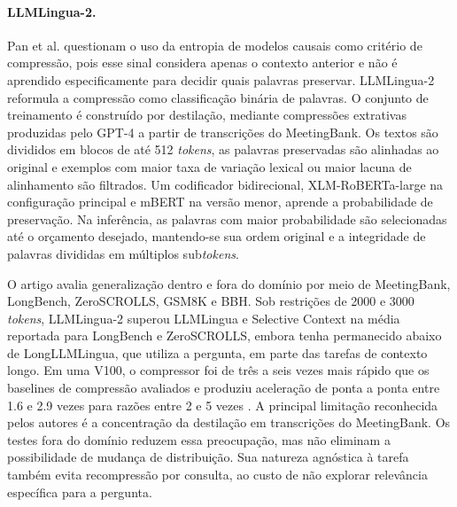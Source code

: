 \paragraph{LLMLingua-2.}
Pan et al. \cite{pan2024llmlingua2} questionam o uso da entropia de modelos causais como critério de compressão, pois esse sinal considera apenas o contexto anterior e não é aprendido especificamente para decidir quais palavras preservar. LLMLingua-2 reformula a compressão como classificação binária de palavras. O conjunto de treinamento é construído por destilação, mediante compressões extrativas produzidas pelo GPT-4 a partir de transcrições do MeetingBank. Os textos são divididos em blocos de até 512 \textit{tokens}, as palavras preservadas são alinhadas ao original e exemplos com maior taxa de variação lexical ou maior lacuna de alinhamento são filtrados. Um codificador bidirecional, XLM-RoBERTa-large na configuração principal e mBERT na versão menor, aprende a probabilidade de preservação. Na inferência, as palavras com maior probabilidade são selecionadas até o orçamento desejado, mantendo-se sua ordem original e a integridade de palavras divididas em múltiplos sub\textit{tokens}.

O artigo avalia generalização dentro e fora do domínio por meio de MeetingBank, LongBench, ZeroSCROLLS, GSM8K e BBH. Sob restrições de 2000 e 3000 \textit{tokens}, LLMLingua-2 superou LLMLingua e Selective Context na média reportada para LongBench e ZeroSCROLLS, embora tenha permanecido abaixo de LongLLMLingua, que utiliza a pergunta, em parte das tarefas de contexto longo. Em uma V100, o compressor foi de três a seis vezes mais rápido que os baselines de compressão avaliados e produziu aceleração de ponta a ponta entre 1.6 e 2.9 vezes para razões entre 2 e 5 vezes \cite{pan2024llmlingua2}. A principal limitação reconhecida pelos autores é a concentração da destilação em transcrições do MeetingBank. Os testes fora do domínio reduzem essa preocupação, mas não eliminam a possibilidade de mudança de distribuição. Sua natureza agnóstica à tarefa também evita recompressão por consulta, ao custo de não explorar relevância específica para a pergunta.

